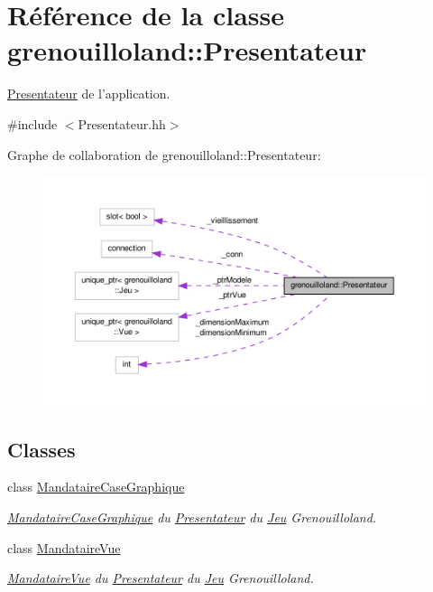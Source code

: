 \hypertarget{classgrenouilloland_1_1Presentateur}{\section{Référence de la classe grenouilloland\-:\-:Presentateur}
\label{classgrenouilloland_1_1Presentateur}
}


\hyperlink{classgrenouilloland_1_1Presentateur}{Presentateur} de l'application.  




{\ttfamily \#include $<$Presentateur.\-hh$>$}



Graphe de collaboration de grenouilloland\-:\-:Presentateur\-:
\nopagebreak
\begin{figure}[H]
\begin{center}
\leavevmode
\includegraphics[width=350pt]{classgrenouilloland_1_1Presentateur__coll__graph}
\end{center}
\end{figure}
\subsection*{Classes}
\begin{DoxyCompactItemize}
\item 
class \hyperlink{classgrenouilloland_1_1Presentateur_1_1MandataireCaseGraphique}{Mandataire\-Case\-Graphique}
\begin{DoxyCompactList}\small\item\em \hyperlink{classgrenouilloland_1_1Presentateur_1_1MandataireCaseGraphique}{Mandataire\-Case\-Graphique} du \hyperlink{classgrenouilloland_1_1Presentateur}{Presentateur} du \hyperlink{classgrenouilloland_1_1Jeu}{Jeu} Grenouilloland. \end{DoxyCompactList}\item 
class \hyperlink{classgrenouilloland_1_1Presentateur_1_1MandataireVue}{Mandataire\-Vue}
\begin{DoxyCompactList}\small\item\em \hyperlink{classgrenouilloland_1_1Presentateur_1_1MandataireVue}{Mandataire\-Vue} du \hyperlink{classgrenouilloland_1_1Presentateur}{Presentateur} du \hyperlink{classgrenouilloland_1_1Jeu}{Jeu} Grenouilloland. \end{DoxyCompactList}\end{DoxyCompactItemize}
